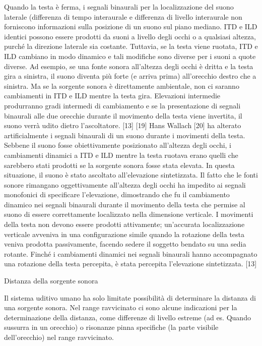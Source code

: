 Quando la testa è ferma, i segnali binaurali per la localizzazione del suono
laterale (differenza di tempo interaurale e differenza di livello interaurale
non forniscono informazioni sulla posizione di un suono sul piano mediano. ITD e
ILD identici possono essere prodotti da suoni a livello degli occhi o a qualsiasi
altezza, purché la direzione laterale sia costante. Tuttavia, se la testa viene
ruotata, ITD e ILD cambiano in modo dinamico e tali modifiche sono diverse per i
suoni a quote diverse. Ad esempio, se una fonte sonora all'altezza degli occhi è
dritta e la testa gira a sinistra, il suono diventa più forte (e arriva prima)
all'orecchio destro che a sinistra. Ma se la sorgente sonora è direttamente
ambientale, non ci saranno cambiamenti in ITD e ILD mentre la testa gira.
Elevazioni intermedie produrranno gradi intermedi di cambiamento e se la
presentazione di segnali binaurali alle due orecchie durante il movimento della
testa viene invertita, il suono verrà udito dietro l'ascoltatore. [13] [19] Hans
Wallach [20] ha alterato artificialmente i segnali binaurali di un suono durante
i movimenti della testa. Sebbene il suono fosse obiettivamente posizionato
all'altezza degli occhi, i cambiamenti dinamici a ITD e ILD mentre la testa
ruotava erano quelli che sarebbero stati prodotti se la sorgente sonora fosse
stata elevata. In questa situazione, il suono è stato ascoltato all'elevazione
sintetizzata. Il fatto che le fonti sonore rimangano oggettivamente all'altezza
degli occhi ha impedito ai segnali monofonici di specificare l'elevazione,
dimostrando che fu il cambiamento dinamico nei segnali binaurali durante il
movimento della testa che permise al suono di essere correttamente localizzato
nella dimensione verticale. I movimenti della testa non devono essere prodotti
attivamente; un'accurata localizzazione verticale avveniva in una configurazione
simile quando la rotazione della testa veniva prodotta passivamente, facendo
sedere il soggetto bendato su una sedia rotante. Finché i cambiamenti dinamici
nei segnali binaurali hanno accompagnato una rotazione della testa percepita,
è stata percepita l'elevazione sintetizzata. [13]

Distanza della sorgente sonora

Il sistema uditivo umano ha solo limitate possibilità di determinare la distanza
di una sorgente sonora. Nel range ravvicinato ci sono alcune indicazioni per la
determinazione della distanza, come differenze di livello estreme (ad es.
Quando sussurra in un orecchio) o risonanze pinna specifiche (la parte visibile
dell'orecchio) nel range ravvicinato.

